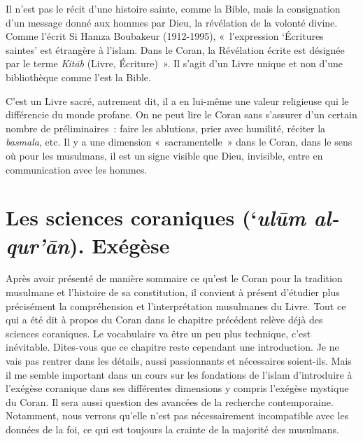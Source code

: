 
Il n'est pas le récit d'une histoire sainte, comme la Bible, mais la
consignation d'un message donné aux hommes par Dieu, la révélation de la
volonté divine. Comme l'écrit Si Hamza Boubakeur (1912-1995),
«~l'expression `Écritures saintes' est étrangère à l'islam. Dans le
Coran, la Révélation écrite est désignée par le terme \emph{Kitāb}
(Livre, Écriture)~». Il s'agit
d'un Livre unique et non d'une bibliothèque comme l'est la Bible.

C'est un Livre sacré, autrement dit, il a en lui-même une valeur
religieuse qui le différencie du monde profane. On ne peut lire le Coran
sans s'assurer d'un certain nombre de préliminaires~: faire les
ablutions, prier avec humilité, réciter la \emph{basmala}, etc. Il y a
une dimension «~sacramentelle~» dans le Coran, dans le sens où pour les
musulmans, il est un signe visible que Dieu, invisible, entre en
communication avec les hommes.


\chapter{Les sciences coraniques (`\emph{ulūm al-qur'ān}). Exégèse}

Après avoir présenté de manière sommaire ce qu'est le Coran pour la
tradition musulmane et l'histoire de sa constitution, il convient à
présent d'étudier plus précisément la compréhension et l'interprétation
musulmanes du Livre. Tout ce qui a été dit à propos du Coran dans le
chapitre précédent relève déjà des sciences coraniques. Le vocabulaire
va être un peu plus technique, c'est inévitable. Dites-vous que ce
chapitre reste cependant une introduction. Je ne vais pas rentrer dans
les détails, aussi passionnants et nécessaires soient-ils. Mais il me
semble important dans un cours sur les fondations de l'islam
d'introduire à l'exégèse coranique dans ses différentes dimensions y
compris l'exégèse mystique du Coran. Il sera aussi question des avancées
de la recherche contemporaine. Notamment, nous verrons qu'elle n'est pas
nécessairement incompatible avec les données de la foi, ce qui est
toujours la crainte de la majorité des musulmans.


